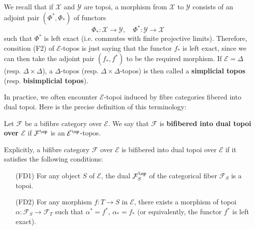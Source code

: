 We recall that if $\mathcal{X}$ and $\mathcal{Y}$ are topoi, a morphism from $\mathcal{X}$ to $\mathcal{Y}$ consists of an adjoint pair $(\Phi^*,\Phi_*)$ of functors
\[\Phi_*:\mathcal{X}\to \mathcal{Y},\quad \Phi^*:\mathcal{Y}\to \mathcal{X}\]
such that $\Phi^*$ is left exact (i.e. commutes with finite projective limits). Therefore, consition (F2) of $\mathcal{E}$-topos is just saying that the functor $f_*$ is left exact, since we can then take the adjoint pair $(f_*,f^*)$ to be the required morphism. If $\mathcal{E}=\Delta$ (resp. $\Delta\times\Delta$), a $\Delta$-topos (resp. $\Delta\times\Delta$-topos) is then called a \textbf{simplicial topos} (resp. \textbf{bisimplicial topos}).\par

In practice, we often encounter $\mathcal{E}$-topoi induced by fibre categories fibered into dual topoi. Here is the precise definition of this terminology:
\begin{definition}
Let $\mathcal{F}$ be a bifibre category over $\mathcal{E}$. We say that $\mathcal{F}$ is \textbf{bifibered into dual topoi over $\mathcal{E}$} if $\mathcal{F}^{\op}$ is an $\mathcal{E}^{\op}$-topos.
\end{definition}

Explicitly, a bifibre category $\mathcal{F}$ over $\mathcal{E}$ is bifibered into dual topoi over $\mathcal{E}$ if it satisfies the following conditions:
\begin{enumerate}[leftmargin=40pt]
\item[(FD1)] For any object $S$ of $\mathcal{E}$, the dual $\mathcal{F}^{\op}_S$ of the categorical fiber $\mathcal{F}_S$ is a topoi.
\item[(FD2)] For any morphism $f:T\to S$ in $\mathcal{E}$, there exists a morphism of topoi $\alpha:\mathcal{F}_S\to \mathcal{F}_T$ such that $\alpha^*=f^*$, $\alpha_*=f_*$ (or equivalently, the functor $f^*$ is left exact).
\end{enumerate}

